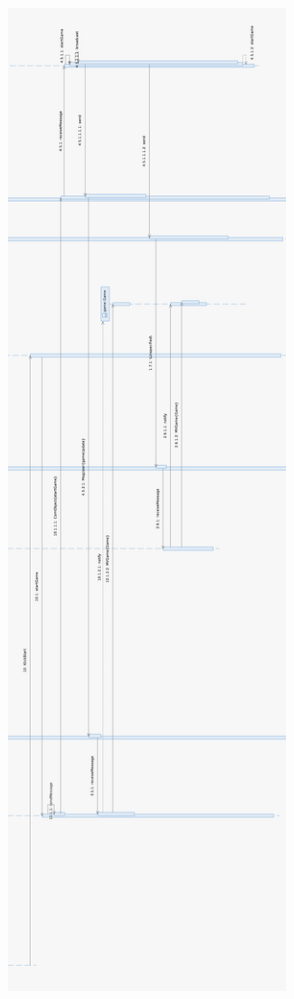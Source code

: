\documentclass{article}
\begin{document}
\includegraphics[width=12cm, height = 26cm]{Entwurf_PlayCard2_3}\\
		
\end{document}
